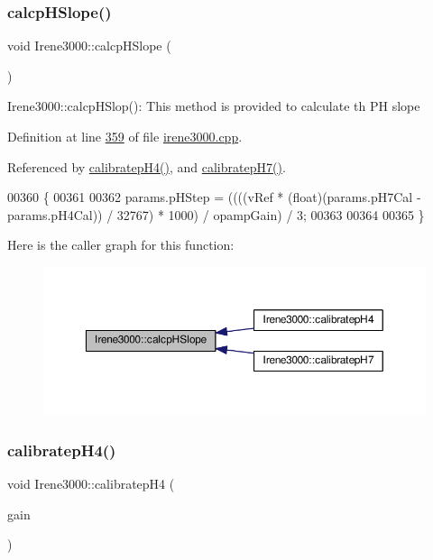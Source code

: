 \subsubsection{\texorpdfstring{calcp\+H\+Slope()}{calcpHSlope()}}
{\footnotesize\ttfamily void Irene3000\+::calcp\+H\+Slope (\begin{DoxyParamCaption}{ }\end{DoxyParamCaption})}

Irene3000\+::calcp\+H\+Slop()\+: This method is provided to calculate th PH slope 

Definition at line \hyperlink{irene3000_8cpp_source_l00359}{359} of file \hyperlink{irene3000_8cpp_source}{irene3000.\+cpp}.



Referenced by \hyperlink{irene3000_8cpp_source_l00341}{calibratep\+H4()}, and \hyperlink{irene3000_8cpp_source_l00325}{calibratep\+H7()}.


\begin{DoxyCode}
00360 \{
00361 
00362   params.pHStep = ((((vRef * (float)(params.pH7Cal - params.pH4Cal)) / 32767) * 1000) / opampGain) / 3;
00363 
00364  
00365 \}
\end{DoxyCode}
Here is the caller graph for this function\+:
\nopagebreak
\begin{figure}[H]
\begin{center}
\leavevmode
\includegraphics[width=350pt]{class_irene3000_a81f6a79e546679692053f7ac1af49613_icgraph}
\end{center}
\end{figure}
\mbox{\label{class_irene3000_a9772eeea2305fad6236a82e33e93892e}} 
\subsubsection{\texorpdfstring{calibratep\+H4()}{calibratepH4()}}
{\footnotesize\ttfamily void Irene3000\+::calibratep\+H4 (\begin{DoxyParamCaption}\item[{ads\+Gain\+\_\+t}]{gain }\end{DoxyParamCaption})}

